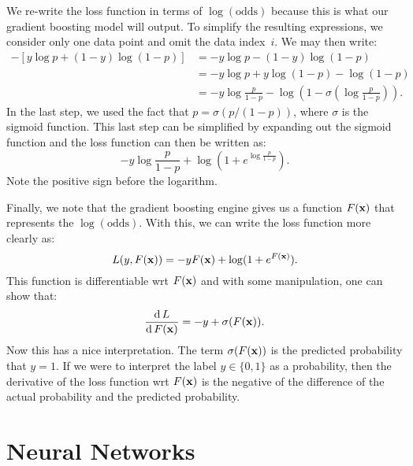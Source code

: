 We re-write the loss function in terms of $\log (\text{odds})$ because this 
is what our gradient boosting model will output. To simplify the resulting 
expressions, we consider only one data point and omit the data index~$i$. 
We may then write:
\begin{align*}
    - \left [ y \log p + (1 - y) \log (1 - p) \right ] 
        & = - y \log p - (1 - y) \log (1 - p) \\
        & = - y \log p + y \log (1 - p) - \log (1 - p) \\
        & = - y \log \frac{p}{1 - p} - 
                \log \left (1 - \sigma \left ( \log \frac{p}{1 - p} \right ) \right ).
\end{align*}
In the last step, we used the fact that $p = \sigma (p / (1 - p))$, where $\sigma$
is the sigmoid function. This last step can be simplified by expanding out the 
sigmoid function and the loss function can then be written as:
\[
    - y \log \frac{p}{1 - p} + \log (1 + e^{\log \frac{p}{1 - p}}).
\]
Note the positive sign before the logarithm. 

Finally, we note that the gradient 
boosting engine gives us a function $F(\mathbf{x})$ that represents the 
$\log (\text{odds})$. With this, we can write the loss function more clearly as:
\[
    L(y, F(\mathbf{x})) = -y F(\mathbf{x}) + \log (1 + e^{F(\mathbf{x})}).
\]
This function is differentiable wrt $F(\mathbf{x})$ and with some manipulation, 
one can show that:
\[
    \frac{\operatorname{d} L}{\operatorname{d} F(\mathbf{x})} = - y + \sigma (F(\mathbf{x})). 
\]
Now this has a nice interpretation. The term $\sigma (F(\mathbf{x}))$ is the 
predicted probability that $y = 1$. If we were to interpret the label 
$y \in \{0, 1\}$ as a probability, then the derivative of the loss function 
wrt $F(\mathbf{x})$ is the negative of the difference of the actual probability 
and the predicted probability. 

\chapter{Neural Networks}

